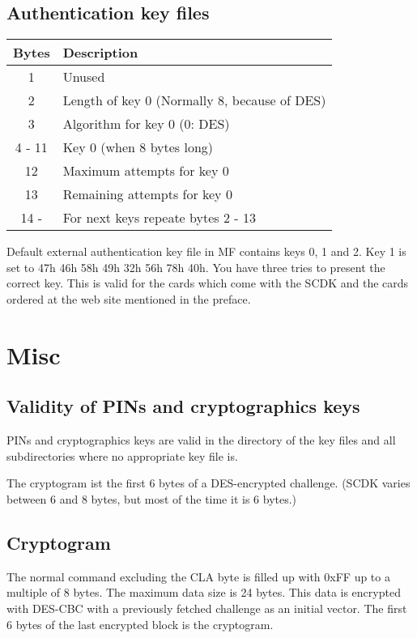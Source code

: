 \documentclass[a4paper,oneside]{article}
\begin{document}
\subsection{Authentication key files}

\begin{center}
\begin{tabular}{|c|l|} \hline
Bytes & Description \\ \hline \hline
1     & Unused \\ \hline
2     & Length of key 0 (Normally 8, because of DES) \\ \hline
3     & Algorithm for key 0 (0: DES) \\ \hline
4 - 11 & Key 0 (when 8 bytes long) \\ \hline
12    & Maximum attempts for key 0 \\ \hline
13    & Remaining attempts for key 0 \\ \hline
14 -  & For next keys repeate bytes 2 - 13 \\ \hline
\end{tabular}
\end{center}

Default external authentication key file in MF contains keys 0, 1 and 2.
Key 1 is set to 47h 46h 58h 49h 32h 56h 78h 40h. You have three tries
to present the correct key. This is valid for the cards which come with
the SCDK and the cards ordered at the web site mentioned in the preface.

\section{Misc}

\subsection{Validity of PINs and cryptographics keys}

PINs and cryptographics keys are valid in the directory of the key
files and all subdirectories where no appropriate key file is.

The cryptogram ist the first 6 bytes of a DES-encrypted challenge.
(SCDK varies between 6 and 8 bytes, but most of the time it is 6 bytes.)

\subsection{Cryptogram}

The normal command excluding the CLA byte is filled up with 0xFF
up to a multiple of 8 bytes. The maximum data size is 24 bytes.
This data is encrypted with DES-CBC with a previously fetched
challenge as an initial vector. The first 6 bytes of the last
encrypted block is the cryptogram.
\end{document}
